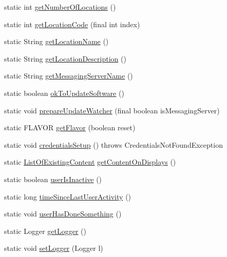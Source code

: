 \begin{DoxyCompactItemize}
\item 
static int \hyperlink{classgov_1_1fnal_1_1ppd_1_1dd_1_1GlobalVariables_af9305013fcd1f485a77e6448b5b14ebb}{get\-Number\-Of\-Locations} ()
\item 
static int \hyperlink{classgov_1_1fnal_1_1ppd_1_1dd_1_1GlobalVariables_afa655a7918baebe5606c9a936f25a2b5}{get\-Location\-Code} (final int index)
\item 
static String \hyperlink{classgov_1_1fnal_1_1ppd_1_1dd_1_1GlobalVariables_a2b6eb3cd0162c4ef8a7476afc3180602}{get\-Location\-Name} ()
\item 
static String \hyperlink{classgov_1_1fnal_1_1ppd_1_1dd_1_1GlobalVariables_a0dd398dcbd954f1d5c9060a40567cde8}{get\-Location\-Description} ()
\item 
static String \hyperlink{classgov_1_1fnal_1_1ppd_1_1dd_1_1GlobalVariables_a031a776923237b72e7cfa1e2804097ad}{get\-Messaging\-Server\-Name} ()
\item 
static boolean \hyperlink{classgov_1_1fnal_1_1ppd_1_1dd_1_1GlobalVariables_a3d2db19203c4e972d23055ac6ca6d728}{ok\-To\-Update\-Software} ()
\item 
static void \hyperlink{classgov_1_1fnal_1_1ppd_1_1dd_1_1GlobalVariables_a7a261637e9a06bba925ba4901ecf4479}{prepare\-Update\-Watcher} (final boolean is\-Messaging\-Server)
\item 
static F\-L\-A\-V\-O\-R \hyperlink{classgov_1_1fnal_1_1ppd_1_1dd_1_1GlobalVariables_a43d1f44dce5ac77b0d03e3c58a8f9533}{get\-Flavor} (boolean reset)
\item 
static void \hyperlink{classgov_1_1fnal_1_1ppd_1_1dd_1_1GlobalVariables_a3beb933e8664bc5cf625f37d4e0ad429}{credentials\-Setup} ()  throws Credentials\-Not\-Found\-Exception 
\item 
static \hyperlink{classgov_1_1fnal_1_1ppd_1_1dd_1_1changer_1_1ListOfExistingContent}{List\-Of\-Existing\-Content} \hyperlink{classgov_1_1fnal_1_1ppd_1_1dd_1_1GlobalVariables_a5dee2a221fa2d94a5baa8558800845e3}{get\-Content\-On\-Displays} ()
\item 
static boolean \hyperlink{classgov_1_1fnal_1_1ppd_1_1dd_1_1GlobalVariables_aba515ddabffe804f9830689e02ef0cda}{user\-Is\-Inactive} ()
\item 
static long \hyperlink{classgov_1_1fnal_1_1ppd_1_1dd_1_1GlobalVariables_a7480064c523e0ebb558122616d32544f}{time\-Since\-Last\-User\-Activity} ()
\item 
static void \hyperlink{classgov_1_1fnal_1_1ppd_1_1dd_1_1GlobalVariables_a526d778baf99fcb1eb1648e91c5e346d}{user\-Has\-Done\-Something} ()
\item 
static Logger \hyperlink{classgov_1_1fnal_1_1ppd_1_1dd_1_1GlobalVariables_a5f0114f559702931f77f0e571be95752}{get\-Logger} ()
\item 
static void \hyperlink{classgov_1_1fnal_1_1ppd_1_1dd_1_1GlobalVariables_a14e776ad97d0c10931fd61205c9d2b6f}{set\-Logger} (Logger l)
\end{DoxyCompactItemize}
